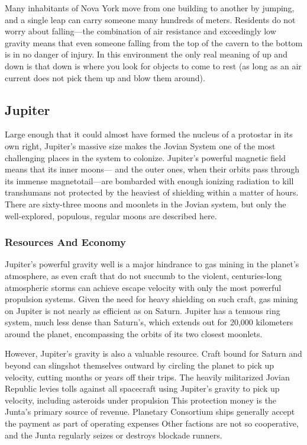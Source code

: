 Many inhabitants of Nova York move from one 
building to another by jumping, and a single leap can 
carry someone many hundreds of meters. Residents 
do not worry about falling—the combination of air 
resistance and exceedingly low gravity means that 
even someone falling from the top of the cavern to 
the bottom is in no danger of injury. In this environment
the only real meaning of up and down is that
down is where you look for objects to come to rest 
(as long as an air current does not pick them up and 
blow them around).

\subsection{Jupiter}

Large enough that it could almost have formed the 
nucleus of a protostar in its own right, Jupiter's massive
size makes the Jovian System one of the most
challenging places in the system to colonize. Jupiter's 
powerful magnetic field means that its inner moons—
and the outer ones, when their orbits pass through its 
immense magnetotail—are bombarded with enough 
ionizing radiation to kill transhumans not protected 
by the heaviest of shielding within a matter of hours. 
There are sixty-three moons and moonlets in the 
Jovian system, but only the well-explored, populous, 
regular moons are described here.

\subsubsection{Resources And Economy}

Jupiter's powerful gravity well is a major hindrance 
to gas mining in the planet's atmosphere, as even craft 
that do not succumb to the violent, centuries-long 
atmospheric storms can achieve escape velocity with 
only the most powerful propulsion systems. Given the 
need for heavy shielding on such craft, gas mining on 
Jupiter is not nearly as efficient as on Saturn. Jupiter
has a tenuous ring system, much less dense than
Saturn's, which extends out for 20,000 kilometers 
around the planet, encompassing the orbits of its two 
closest moonlets.

However, Jupiter's gravity is also a valuable 
resource. Craft bound for Saturn and beyond can 
slingshot themselves outward by circling the planet 
to pick up velocity, cutting months or years off their 
trips. The heavily militarized Jovian Republic levies 
tolls against all spacecraft using Jupiter's gravity to 
pick up velocity, including asteroids under propulsion
This protection money is the Junta's primary
source of revenue. Planetary Consortium ships generally
accept the payment as part of operating expenses
Other factions are not so cooperative, and the
Junta regularly seizes or destroys blockade runners.

